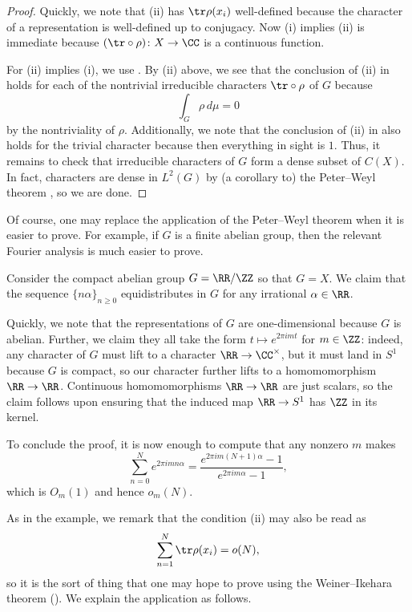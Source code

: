 \documentclass[../thesis.tex]{subfiles}
\begin{document}
\begin{proof}
	Quickly, we note that (ii) has $\tr\rho(x_i)$ well-defined because the character of a representation is well-defined up to conjugacy. Now (i) implies (ii) is immediate because $({\tr}\circ\rho)\colon X\to\CC$ is a continuous function.
	
	For (ii) implies (i), we use . By (ii) above, we see that the conclusion of (ii) in  holds for each of the nontrivial irreducible characters ${\tr}\circ\rho$ of $G$ because
	\[\int_G\rho\,d\mu=0\]
	by the nontriviality of $\rho$. Additionally, we note that the conclusion of (ii) in   also holds for the trivial character because then everything in sight is $1$. Thus, it remains to check that irreducible characters of $G$ form a dense subset of $C(X)$. In fact, characters are dense in $L^2(G)$ by (a corollary to) the Peter--Weyl theorem \cite[Proposition~5.23]{folland-harmonic-analysis}, so we are done.
\end{proof}
\begin{remark}
	Of course, one may replace the application of the Peter--Weyl theorem when it is easier to prove. For example, if $G$ is a finite abelian group, then the relevant Fourier analysis is much easier to prove.
\end{remark}
\begin{example}
	Consider the compact abelian group $G=\RR/\ZZ$ so that $G=X$. We claim that the sequence $\{n\alpha\}_{n\ge0}$ equidistributes in $G$ for any irrational $\alpha\in\RR$.
	
	Quickly, we note that the representations of $G$ are one-dimensional because $G$ is abelian. Further, we claim they all take the form $t\mapsto e^{2\pi imt}$ for $m\in\ZZ$: indeed, any character of $G$ must lift to a character $\RR\to\CC^\times$, but it must land in $S^1$ because $G$ is compact, so our character further lifts to a homomomorphism $\RR\to\RR$. Continuous homomomorphisms $\RR\to\RR$ are just scalars, so the claim follows upon ensuring that the induced map $\RR\to S^1$ has $\ZZ$ in its kernel.

	To conclude the proof, it is now enough to compute that any nonzero $m$ makes
	\[\sum_{n=0}^Ne^{2\pi imn\alpha}=\frac{e^{2\pi im(N+1)\alpha}-1}{e^{2\pi im\alpha}-1},\]
	which is $O_m(1)$ and hence $o_m(N)$.
\end{example}
As in the example, we remark that the condition (ii) may also be read as
\[\sum_{n=1}^N\tr\rho(x_i)=o(N),\]
so it is the sort of thing that one may hope to prove using the Weiner--Ikehara theorem (). We explain the application as follows.
\end{document}
